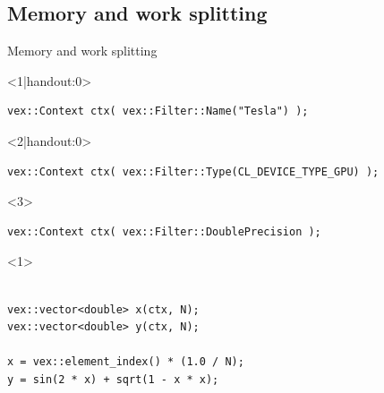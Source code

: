\documentclass[@BEAMER_OPTIONS@]{beamer}
\begin{document}
\subsection{Memory and work splitting}

\begin{frame}[fragile]{Memory and work splitting}
    \begin{exampleblock}{}
        \begin{onlyenv}<1|handout:0>
        \begin{lstlisting}
vex::Context ctx( vex::Filter::Name("Tesla") );
        \end{lstlisting}
        \end{onlyenv}
        \begin{onlyenv}<2|handout:0>
        \begin{lstlisting}
vex::Context ctx( vex::Filter::Type(CL_DEVICE_TYPE_GPU) );
        \end{lstlisting}
        \end{onlyenv}
        \begin{onlyenv}<3>
        \begin{lstlisting}
vex::Context ctx( vex::Filter::DoublePrecision );
        \end{lstlisting}
        \end{onlyenv}
        \begin{uncoverenv}<1>
        \begin{lstlisting}[firstnumber=last]

vex::vector<double> x(ctx, N);
vex::vector<double> y(ctx, N);

x = vex::element_index() * (1.0 / N);
y = sin(2 * x) + sqrt(1 - x * x);
        \end{lstlisting}
        \end{uncoverenv}
    \end{exampleblock}
    \begin{figure}
\end{figure}
\end{frame}
\end{document}
